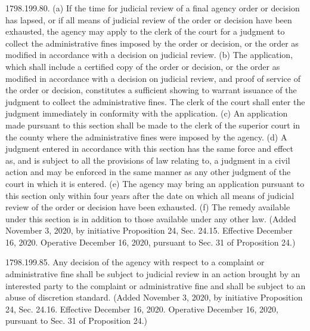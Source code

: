 1798.199.80.  (a) If the time for judicial review of a final agency order or decision has lapsed, or if all means of judicial review of the order or decision have been exhausted, the agency may apply to the clerk of the court for a judgment to collect the administrative fines imposed by the order or decision, or the order as modified in accordance with a decision on judicial review.
(b) The application, which shall include a certified copy of the order or decision, or the order as modified in accordance with a decision on judicial review, and proof of service of the order or decision, constitutes a sufficient showing to warrant issuance of the judgment to collect the administrative fines. The clerk of the court shall enter the judgment immediately in conformity with the application.
(c) An application made pursuant to this section shall be made to the clerk of the superior court in the county where the administrative fines were imposed by the agency.
(d) A judgment entered in accordance with this section has the same force and effect as, and is subject to all the provisions of law relating to, a judgment in a civil action and may be enforced in the same manner as any other judgment of the court in which it is entered.
(e) The agency may bring an application pursuant to this section only within four years after the date on which all means of judicial review of the order or decision have been exhausted.
(f) The remedy available under this section is in addition to those available under any other law.
(Added November 3, 2020, by initiative Proposition 24, Sec. 24.15. Effective December 16, 2020. Operative December 16, 2020, pursuant to Sec. 31 of Proposition 24.)

1798.199.85.  Any decision of the agency with respect to a complaint or administrative fine shall be subject to judicial review in an action brought by an interested party to the complaint or administrative fine and shall be subject to an abuse of discretion standard.
(Added November 3, 2020, by initiative Proposition 24, Sec. 24.16. Effective December 16, 2020. Operative December 16, 2020, pursuant to Sec. 31 of Proposition 24.)


